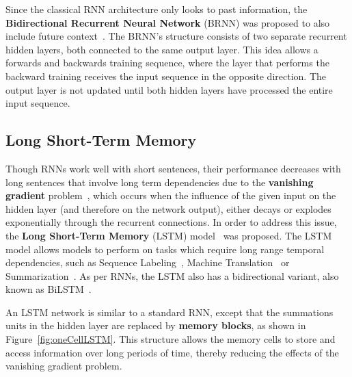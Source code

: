 Since the classical RNN architecture only looks to past information, the \textbf{Bidirectional 
Recurrent Neural Network} (BRNN) was proposed to also include future 
context~\cite{appendix:SchusterP97}. The BRNN’s structure consists of two separate recurrent 
hidden layers, both connected to the same output layer. This idea allows a forwards and 
backwards training sequence, where the layer that performs the backward training receives the 
input sequence in the opposite direction. The output layer is not updated until both hidden 
layers have processed the entire input sequence.

\subsection{Long Short-Term Memory}
Though RNNs work well with short sentences, their performance decreases with long sentences 
that involve long term dependencies due to the \textbf{vanishing gradient} 
problem~\cite{seqlab:HochreiterS97, appendix:hochreiter2001gradient}, which occurs when the 
influence of the given input on the hidden layer (and therefore on the network output), 
either decays or explodes exponentially through the recurrent connections. In order to 
address this issue, the \textbf{Long Short-Term Memory} (LSTM) model~\cite{seqlab:HochreiterS97} 
was proposed. The LSTM model allows models to perform on tasks which require long range 
temporal dependencies, such as Sequence Labeling~\cite{seqlab:HuangXY15, seqlab:MaH16}, 
Machine Translation~\cite{nlToSparql:WuSCLNMKCGMKSJL16} or Summarization~\cite{appendix:MahasseniLT17}. 
As per RNNs, the LSTM also has a bidirectional variant, also known as 
BiLSTM~\cite{appendix:graves2005framewise,appendix:ChenC04a,appendix:ThireouR07}. 

An LSTM network is similar to a standard RNN, except that the summations units in the hidden 
layer are replaced by \textbf{memory blocks}, as shown in Figure~\ref{fig:oneCellLSTM}. This 
structure allows the memory cells to store and access information over long periods of time, 
thereby reducing the effects of the vanishing gradient problem.

